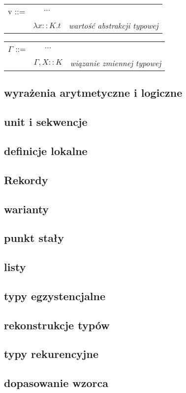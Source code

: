 \documentclass[11pt,leqno]{article}
\begin{document}
\begin{tabular}{ l c r }
  v ::= & $\cdots$ &  \\
   & $\lambda x::K.t$ & \textit{wartość abstrakcji typowej} \\
\end{tabular}

\begin{tabular}{ l c r }
  $\Gamma$ ::= & $\cdots$ &  \\
   & $\Gamma,X::K$& \textit{wiązanie zmiennej typowej} \\ 
\end{tabular}

\subsection{wyrażenia arytmetyczne i logiczne}
\subsection{unit i sekwencje}
\subsection{definicje lokalne}
\subsection{Rekordy}
\subsection{warianty}
\subsection{punkt stały}
\subsection{listy}
\subsection{typy egzystencjalne}
\subsection{rekonstrukcje typów}
\subsection{typy rekurencyjne}
\subsection{dopasowanie wzorca}
\end{document}
